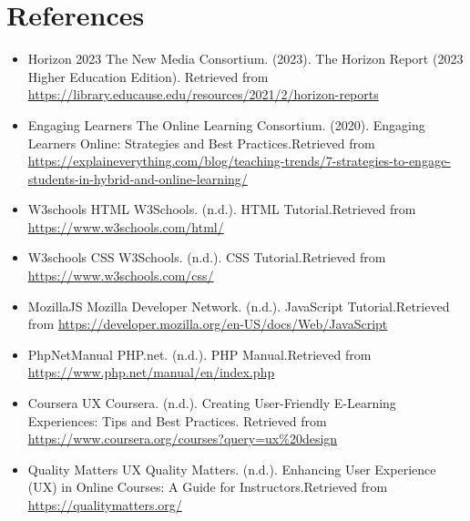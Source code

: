 \section{References}
\begin{itemize}
   


\item{Horizon 2023}
The New Media Consortium. (2023). {The Horizon Report (2023 Higher Education Edition)}. \newline Retrieved from \url{https://library.educause.edu/resources/2021/2/horizon-reports}

\item{Engaging Learners}
The Online Learning Consortium. (2020). Engaging Learners Online: Strategies and Best Practices.\newline Retrieved from \url{https://explaineverything.com/blog/teaching-trends/7-strategies-to-engage-students-in-hybrid-and-online-learning/}

\item{W3schools HTML}
W3Schools. (n.d.). HTML Tutorial.\newline Retrieved from \url{https://www.w3schools.com/html/}

\item{W3schools CSS}
W3Schools. (n.d.). CSS Tutorial.\newline Retrieved from \url{https://www.w3schools.com/css/}

\item{MozillaJS}
Mozilla Developer Network. (n.d.). JavaScript Tutorial.\newline Retrieved from \url{https://developer.mozilla.org/en-US/docs/Web/JavaScript}

\item{PhpNetManual}
PHP.net. (n.d.). PHP Manual.\newline Retrieved from \url{https://www.php.net/manual/en/index.php}

\item{Coursera UX}
Coursera. (n.d.). Creating User-Friendly E-Learning Experiences: Tips and Best Practices. \newline Retrieved from \url{https://www.coursera.org/courses?query=ux%20design}

\item{Quality Matters UX}
Quality Matters. (n.d.). Enhancing User Experience (UX) in Online Courses: A Guide for Instructors.\newline Retrieved from \url{https://qualitymatters.org/}


\end{itemize}
